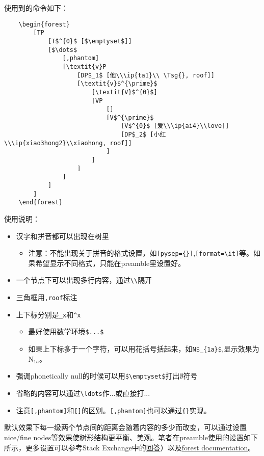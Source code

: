 \documentclass[a4paper,12pt]{article}
\begin{document}
\vspace{3mm}
使用到的命令如下：
\begin{Verbatim}
	\begin{forest}
		[TP
			[T$^{0}$ [$\emptyset$]]
			[$\dots$
				[,phantom]
				[\textit{v}P
					[DP$_1$ [他\\\ip{ta1}\\ \Tsg{}, roof]]
					[\textit{v}$^{\prime}$
						[\textit{V}$^{0}$]
						[VP
							[]
							[V$^{\prime}$
								[V$^{0}$ [爱\\\ip{ai4}\\love]]
								[DP$_2$ [小红\\\ip{xiao3hong2}\\xiaohong, roof]]
							]	
						]	
					]
				]
			]
		]	
	\end{forest}
\end{Verbatim}

\vspace{3mm}
使用说明：
\begin{itemize}
	\item 汉字和拼音都可以出现在树里
	\begin{itemize}
		\item 注意：不能出现关于拼音的格式设置，如\verb|[pysep={}]|,\verb|[format=\it]|等。如果希望显示不同格式，只能在preamble里设置好。
	\end{itemize}
	\item 一个节点下可以出现多行内容，通过\verb|\\|隔开
	\item 三角框用\verb|,roof|标注
	\item 上下标分别是\verb|_x|和\verb|^x|
	\begin{itemize}
		\item 最好使用数学环境\verb|$...$|
		\item 如果上下标多于一个字符，可以用花括号括起来，如\verb|N$_{1a}$|,显示效果为N$_{1a}$。
	\end{itemize}
	\item 强调phonetically null的时候可以用\verb|$\emptyset$|打出$\emptyset$符号
	\item 省略的内容可以通过\verb|\ldots|作$\dots$或直接打...
	\item 注意\verb|[,phantom]|和\verb|[]|的区别。\verb|[,phantom]|也可以通过\verb|{}|实现。
\end{itemize}

默认效果下每一级两个节点间的距离会随着内容的多少而改变，可以通过设置nice/fine nodes等效果使树形结构更平衡、美观。笔者在preamble使用的设置如下所示，更多设置可以参考Stack Exchange中的\href{https://tex.stackexchange.com/questions/367868/a-nice-empty-node-with-nice-nodes-in-forest}{回答}）以及\href{https://mirror.koddos.net/CTAN/graphics/pgf/contrib/forest/forest-doc.pdf}{forest documentation}。
\end{document}
